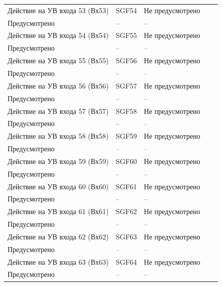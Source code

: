 \begin{longtable}{|>{\centering\arraybackslash}m{5.3cm}|>{\centering\arraybackslash}m{3.3cm}|>{\centering\arraybackslash}m{4.2cm}|>{\centering\arraybackslash}m{1.8cm}|>{\centering\arraybackslash}m{1cm}|}
\hline
\centering Действие на УВ входа 53 (Вх53)  & \centering SGF54 & \centering Не предусмотрено \\ Предусмотрено & \centering -- & \centering \arraybackslash -- \\
\hline
\centering Действие на УВ входа 54 (Вх54)  & \centering SGF55 & \centering Не предусмотрено \\ Предусмотрено & \centering -- & \centering \arraybackslash -- \\
\hline
\centering Действие на УВ входа 55 (Вх55)  & \centering SGF56 & \centering Не предусмотрено \\ Предусмотрено & \centering -- & \centering \arraybackslash -- \\
\hline
\centering Действие на УВ входа 56 (Вх56)  & \centering SGF57 & \centering Не предусмотрено \\ Предусмотрено & \centering -- & \centering \arraybackslash -- \\
\hline
\centering Действие на УВ входа 57 (Вх57)  & \centering SGF58 & \centering Не предусмотрено \\ Предусмотрено & \centering -- & \centering \arraybackslash -- \\
\hline
\centering Действие на УВ входа 58 (Вх58)  & \centering SGF59 & \centering Не предусмотрено \\ Предусмотрено & \centering -- & \centering \arraybackslash -- \\
\hline
\centering Действие на УВ входа 59 (Вх59)  & \centering SGF60 & \centering Не предусмотрено \\ Предусмотрено & \centering -- & \centering \arraybackslash -- \\
\hline
\centering Действие на УВ входа 60 (Вх60)  & \centering SGF61 & \centering Не предусмотрено \\ Предусмотрено & \centering -- & \centering \arraybackslash -- \\
\hline
\centering Действие на УВ входа 61 (Вх61)  & \centering SGF62 & \centering Не предусмотрено \\ Предусмотрено & \centering -- & \centering \arraybackslash -- \\
\hline
\centering Действие на УВ входа 62 (Вх62)  & \centering SGF63 & \centering Не предусмотрено \\ Предусмотрено & \centering -- & \centering \arraybackslash -- \\
\hline
\centering Действие на УВ входа 63 (Вх63)  & \centering SGF64 & \centering Не предусмотрено \\ Предусмотрено & \centering -- & \centering \arraybackslash -- \\

\end{longtable}
